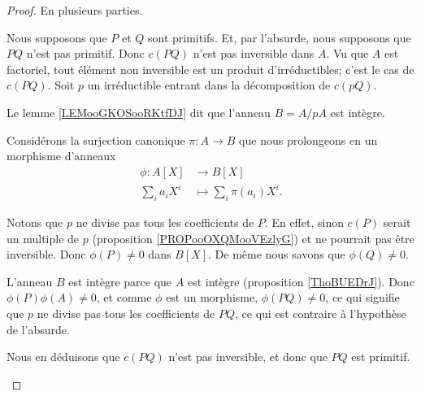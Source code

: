 \begin{proof}
	En plusieurs parties.
	\begin{subproof}
		\spitem[\ref{ITEMooISPDooXdRywE}\( \Rightarrow\)]
		Nous supposons que \( P\) et \( Q\) sont primitifs. Et, par l'absurde, nous supposons que \( PQ\) n'est pas primitif. Donc \( c(PQ)\) n'est pas inversible dans \( A\). Vu que \( A\) est factoriel, tout élément non inversible est un produit d'irréductibles; c'est le cas de \( c(PQ)\). Soit \( p\) un irréductible entrant dans la décomposition de \( c(pQ)\).

		Le lemme \ref{LEMooGKOSooRKtfDJ} dit que l'anneau \( B=A/pA\) est intègre.

		Considérons la surjection canonique \(\pi \colon A\to B  \) que nous prolongeons en un morphisme d'anneaux
		\begin{equation}
			\begin{aligned}
				\phi\colon A[X] & \to B[X]                   \\
				\sum_ia_iX^i    & \mapsto \sum_i\pi(a_i)X^i.
			\end{aligned}
		\end{equation}

		Notons que \( p\) ne divise pas tous les coefficients de \( P\). En effet, sinon \( c(P)\) serait un multiple de \( p\) (proposition \ref{PROPooOXQMooVEzlyG}) et ne pourrait pas être inversible. Donc \( \phi(P)\neq 0\) dans \( B[X]\). De même nous savons que \( \phi(Q)\neq 0\).

		L'anneau \( B\) est intègre parce que \( A\) est intègre (proposition \ref{ThoBUEDrJ}). Donc \( \phi(P)\phi(A)\neq 0\), et comme \( \phi\) est un morphisme, \( \phi(PQ)\neq 0\), ce qui signifie que \( p\) ne divise pas tous les coefficients de \( PQ\), ce qui est contraire à l'hypothèse de l'absurde.

		Nous en déduisons que \( c(PQ)\) n'est pas inversible, et donc que \( PQ\) est primitif.

		\spitem[\ref{ITEMooISPDooXdRywE}\( \Leftarrow\)]


\end{subproof}
\end{proof}
